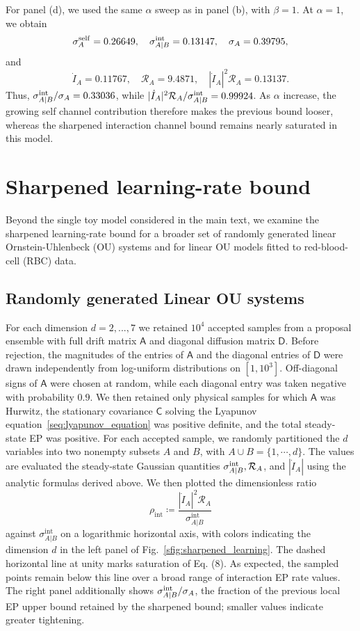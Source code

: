 \documentclass[
 longbibliography,
 twocolumn,
 superscriptaddress,
 amsmath,
 amssymb,
 amsthm,
 amsfonts,
 prl,
 floatfix,
]{revtex4-2}
\newcommand{\matbf}[1]{\boldsymbol{\mathsf{#1}}}
\begin{document}
\begin{widetext}
For panel (d), we used the same $\alpha$ sweep as in panel (b), with $\beta=1$. At $\alpha=1$, we obtain
\[
    \sigma_A^{\rm self}=0.26649,
    \quad
    \sigma_{A|B}^{\rm int}=0.13147,
    \quad
    \sigma_A=0.39795,
\]
and
\[
    \dot I_A=0.11767,
    \quad
    \mathcal R_A=9.4871,
    \quad
    |\dot I_A|^2\mathcal R_A=0.13137.
\]
Thus, $\sigma_{A|B}^{\rm int}/\sigma_A=0.33036$, while $|\dot I_A|^2\mathcal R_A/\sigma_{A|B}^{\rm int}=0.99924$. As $\alpha$ increase, the growing self channel contribution therefore makes the previous bound looser, whereas the sharpened interaction channel bound remains nearly saturated in this model.


\section{Sharpened learning-rate bound}

Beyond the single toy model considered in the main text, we examine the sharpened learning-rate bound for a broader set of randomly generated linear Ornstein-Uhlenbeck (OU) systems and for linear OU models fitted to red-blood-cell (RBC) data.

\subsection{Randomly generated Linear OU systems}
\vspace*{-0.6\baselineskip}

For each dimension $d=2,...,7$ we retained $10^4$ accepted samples from a proposal ensemble with full drift matrix $\matbf A$ and diagonal diffusion matrix $\matbf D$. Before rejection, the magnitudes of the entries of $\matbf A$ and the diagonal entries of $\matbf D$ were drawn independently from log-uniform distributions on $[1,10^3]$. Off-diagonal signs of $\matbf A$ were chosen at random, while each diagonal entry was taken negative with probability $0.9$. We then retained only physical samples for which $\matbf A$ was Hurwitz, the stationary covariance $\matbf C$ solving the Lyapunov equation~\eqref{seq:lyapunov_equation} was positive definite, and the total steady-state EP was positive.
For each accepted sample, we randomly partitioned the $d$ variables into two nonempty subsets $A$ and $B$, with $A\cup B=\{1,\cdots,d\}$. The values are evaluated the steady-state Gaussian quantities $\sigma_{A|B}^{\rm int},\mathcal R_A$, and $|\dot I_A|$ using the analytic formulas derived above. We then plotted the dimensionless ratio
\[
    \rho_{\mathrm{int}}\coloneq
    \frac{\left|\dot I_{A}\right|^2\mathcal R_{A}}{\sigma_{A|B}^{\mathrm{int}}}
\]
against $\sigma_{A|B}^{\mathrm{int}}$ on a logarithmic horizontal axis, with colors indicating the dimension $d$ in the left panel of Fig.~\ref{sfig:sharpened_learning}. The dashed horizontal line at unity marks saturation of Eq. (8). As expected, the sampled points remain below this line over a broad range of interaction EP rate values. The right panel additionally shows $\sigma_{A|B}^{\rm int}/\sigma_A$, the fraction of the previous local EP upper bound retained by the sharpened bound; smaller values indicate greater tightening.


\end{widetext}
\end{document}
